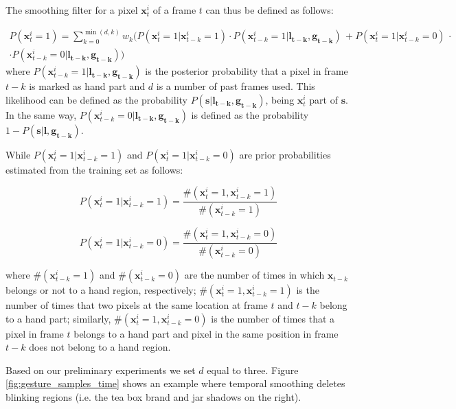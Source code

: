 The smoothing filter for a pixel $\mathbf{x}_{t}^{i}$ of a frame $t$  can thus be defined as follows:

\begin{multline}
P(\mathbf{x}_{t}^{i}=1) = \sum_{k = 0}^{\min(d,k)} w_{k} \bigl( P(\mathbf{x}_{t}^{i}=1|\mathbf{x}_{t-k}^{i}=1) \cdot P(\mathbf{x}_{t-k}^{i}=1|\mathbf{l_{t-k}},\mathbf{g_{t-k}})\, + P(\mathbf{x}_{t}^{i}=1|\mathbf{x}_{t-k}^{i}=0) \, \cdot \\
\cdot P(\mathbf{x}_{t-k}^{i}=0|\mathbf{l_{t-k}},\mathbf{g_{t-k}}) \bigr)
\end{multline}
where $P(\mathbf{x}_{t-k}^{i}=1|\mathbf{l_{t-k}},\mathbf{g_{t-k}})$ is the posterior probability
that a pixel in frame $t-k$ is marked as hand part and $d$ is a number of past frames used. This likelihood can be defined as the probability $P(\mathbf{s}|\mathbf{l_{t-k}},\mathbf{g_{t-k}})$, being
$\mathbf{x}_{t}^{i}$ part of $\mathbf{s}$. In the same way, $P(\mathbf{x}_{t-k}^{i}=0|\mathbf{l_{t-k}},\mathbf{g_{t-k}})$ is defined as the probability
$1-P(\mathbf{s}|\mathbf{l},\mathbf{g_{t-k}})$. 

While $P(\mathbf{x}_{t}^{i}=1|\mathbf{x}_{t-k}^{i}=1)$ and $P(\mathbf{x}_{t}^{i}=1|\mathbf{x}_{t-k}^{i}=0)$ are prior probabilities estimated
from the training set as follows:

\begin{equation}
P(\mathbf{x}_{t}^{i}=1|\mathbf{x}_{t-k}^{i}=1)=\frac{\#(\mathbf{x}_{t}^{i}=1,\mathbf{x}_{t-k}^{i}=1)}{\#(\mathbf{x}_{t-k}^{i}=1)}
\end{equation}


\begin{equation}
P(\mathbf{x}_{t}^{i}=1|\mathbf{x}_{t-k}^{i}=0)=\frac{\#(\mathbf{x}_{t}^{i}=1,\mathbf{x}_{t-k}^{i}=0)}{\#(\mathbf{x}_{t-k}^{i}=0)}
\end{equation}


where $\#(\mathbf{x}_{t-k}^{i}=1)$ and $\#(\mathbf{x}_{t-k}^{i}=0)$ are the number of times in which $\mathbf{x}_{t-k}$ belongs or not to
a hand region, respectively; $\#(\mathbf{x}_{t}^{i}=1,\mathbf{x}_{t-k}^{i}=1)$ is the number
of times that two pixels at the same location at frame $t$ and $t-k$ belong to a hand part; 
similarly, $\#(\mathbf{x}_{t}^{i}=1,\mathbf{x}_{t-k}^{i}=0)$
is the number of times that a pixel in frame $t$ belongs to
a hand part and pixel in the same position in frame $t-k$ does not belong
to a hand region. 

Based on our preliminary experiments we set $d$ equal to three.
Figure \ref{fig:gesture_samples_time} shows an example where temporal smoothing deletes blinking regions (i.e. the tea box brand and jar shadows on the right).


